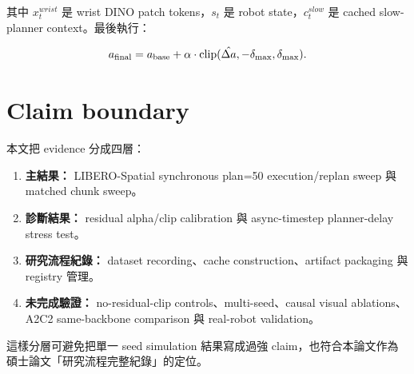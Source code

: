 其中 $x_t^{wrist}$ 是 wrist DINO patch tokens，$s_t$ 是 robot state，$c_t^{slow}$ 是 cached slow-planner context。最後執行：

\begin{equation}
  a_{\mathrm{final}}=a_{\mathrm{base}}+\alpha\cdot\mathrm{clip}(\hat{\Delta a},-\delta_{\max},\delta_{\max}).
  \label{eq:merge}
\end{equation}

\section{Claim boundary}

本文把 evidence 分成四層：

\begin{enumerate}
  \item \textbf{主結果：} LIBERO-Spatial synchronous plan=50 execution/replan sweep 與 matched chunk sweep。
  \item \textbf{診斷結果：} residual alpha/clip calibration 與 async-timestep planner-delay stress test。
  \item \textbf{研究流程紀錄：} dataset recording、cache construction、artifact packaging 與 registry 管理。
  \item \textbf{未完成驗證：} no-residual-clip controls、multi-seed、causal visual ablations、A2C2 same-backbone comparison 與 real-robot validation。
\end{enumerate}

這樣分層可避免把單一 seed simulation 結果寫成過強 claim，也符合本論文作為碩士論文「研究流程完整紀錄」的定位。
